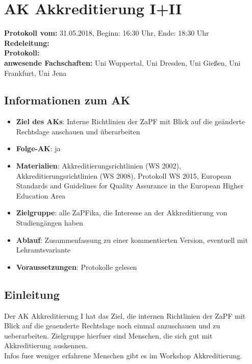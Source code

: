 

\section{AK Akkreditierung I+II}

  \textbf{Protokoll vom:} 31.05.2018, %
  Beginn: 16:30 Uhr, %
  Ende: 18:30 Uhr \\ %
  \textbf{Redeleitung:} \\ %
  \textbf{Protokoll:} \\ %
  \textbf{anwesende Fachschaften:} Uni Wuppertal, Uni Dresden, Uni Gießen, Uni Frankfurt, Uni Jena

  \subsection*{Informationen zum AK}
    \begin{itemize}
    	\item \textbf{Ziel des AKs}: Interne Richtlinien der ZaPF mit Blick auf die geänderte Rechtslage anschauen und überarbeiten
    	\item \textbf{Folge-AK}: ja
      \item \textbf{Materialien}: Akkreditierungsrichtlinien (WS 2002), Akkreditierungsrichtlinien (WS 2008), Protokoll WS 2015, European Standards and Guidelines for Quality Assurance in the European Higher Education Area
    	\item \textbf{Zielgruppe}: alle ZaPFika, die Interesse an der Akkreditierung von Studiengängen haben
    	\item \textbf{Ablauf}: Zusammenfassung zu einer kommentierten Version, eventuell mit Lehramtsvariante
    	\item \textbf{Voraussetzungen}: Protokolle gelesen
    \end{itemize}

  \subsection*{Einleitung}
    Der AK Akkreditierung I hat das Ziel, die internen Richtlinien der ZaPF mit Blick auf die geaenderte Rechtslage noch einmal anzuschauen und zu ueberarbeiten. Zielgruppe hierfuer sind Menschen, die sich gut mit Akkreditierung auskennen. \\

Infos fuer weniger erfahrene Menschen gibt es im Workshop Akkreditierung. \\

